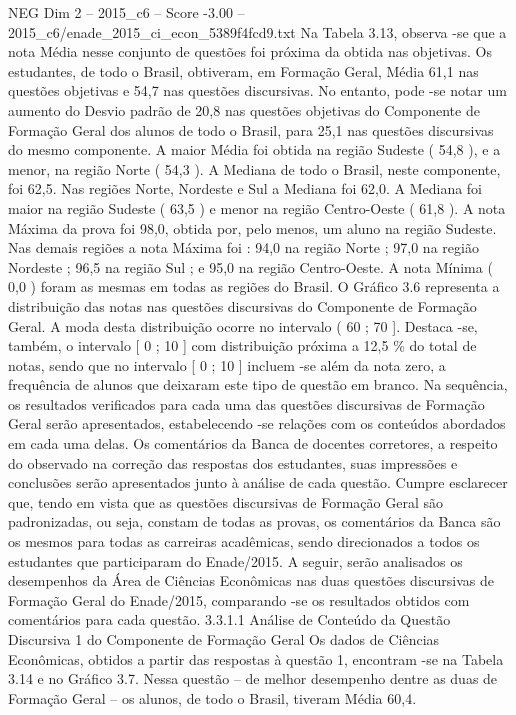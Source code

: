 \begin{textsample}{NEG Dim 2 – 2015\_c6 – Score -3.00 – 2015\_c6/enade\_2015\_ci\_econ\_5389f4fcd9.txt}
Na Tabela 3.13, observa -se que a nota Média nesse conjunto de questões foi próxima da obtida nas objetivas.
Os estudantes, de todo o Brasil, obtiveram, em Formação Geral, Média 61,1 nas questões objetivas e 54,7 nas questões discursivas.
No entanto, pode -se notar um aumento do Desvio padrão de 20,8 nas questões objetivas do Componente de Formação Geral dos alunos de todo o Brasil, para 25,1 nas questões discursivas do mesmo componente.
A maior Média foi obtida na região Sudeste ( 54,8 ), e a menor, na região Norte ( 54,3 ).
A Mediana de todo o Brasil, neste componente, foi 62,5.
Nas regiões Norte, Nordeste e Sul a Mediana foi 62,0.
A Mediana foi maior na região Sudeste ( 63,5 ) e menor na região Centro-Oeste ( 61,8 ).
A nota Máxima da prova foi 98,0, obtida por, pelo menos, um aluno na região Sudeste.
Nas demais regiões a nota Máxima foi : 94,0 na região Norte ; 97,0 na região Nordeste ; 96,5 na região Sul ; e 95,0 na região Centro-Oeste.
A nota Mínima ( 0,0 ) foram as mesmas em todas as regiões do Brasil.
O Gráfico 3.6 representa a distribuição das notas nas questões discursivas do Componente de Formação Geral.
A moda desta distribuição ocorre no intervalo ( 60 ; 70 ].
Destaca -se, também, o intervalo [ 0 ; 10 ] com distribuição próxima a 12,5 \% do total de notas, sendo que no intervalo [ 0 ; 10 ] incluem -se além da nota zero, a frequência de alunos que deixaram este tipo de questão em branco.
Na sequência, os resultados verificados para cada uma das questões discursivas de Formação Geral serão apresentados, estabelecendo -se relações com os conteúdos abordados em cada uma delas.
Os comentários da Banca de docentes corretores, a respeito do observado na correção das respostas dos estudantes, suas impressões e conclusões serão apresentados junto à análise de cada questão.
Cumpre esclarecer que, tendo em vista que as questões discursivas de Formação Geral são padronizadas, ou seja, constam de todas as provas, os comentários da Banca são os mesmos para todas as carreiras acadêmicas, sendo direcionados a todos os estudantes que participaram do Enade/2015.
A seguir, serão analisados os desempenhos da Área de Ciências Econômicas nas duas questões discursivas de Formação Geral do Enade/2015, comparando -se os resultados obtidos com comentários para cada questão. 3.3.1.1 Análise de Conteúdo da Questão Discursiva 1 do Componente de Formação Geral Os dados de Ciências Econômicas, obtidos a partir das respostas à questão 1, encontram -se na Tabela 3.14 e no Gráfico 3.7.
Nessa questão – de melhor desempenho dentre as duas de Formação Geral – os alunos, de todo o Brasil, tiveram Média 60,4.

\end{textsample}
